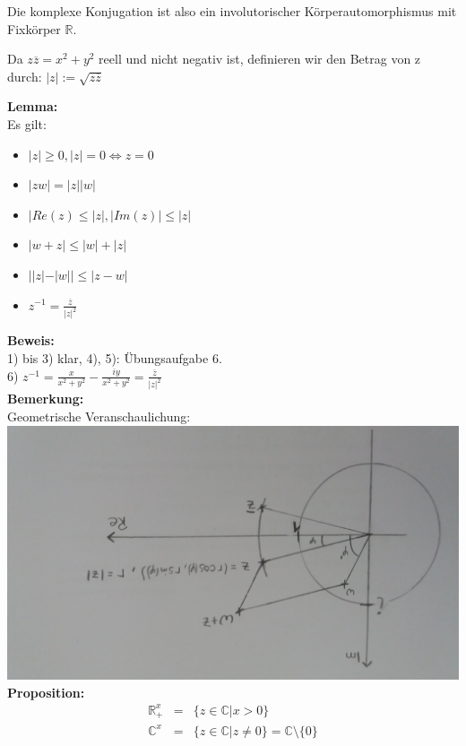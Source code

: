 Die komplexe Konjugation ist also ein involutorischer Körperautomorphismus mit Fixkörper $\mathds{R}$.\\
\begin{definition}
	Da $z\overline{z} = x^2+y^2$ reell und nicht negativ ist, definieren wir den Betrag von z durch: $|z|:= \sqrt{z\overline{z}}$
\end{definition}

\textbf{Lemma: }\\
Es gilt:
\begin{itemize}
	\item
	$|z| \geq 0, |z| = 0 \Leftrightarrow z = 0$
	\item
	$|zw| = |z||w|$
	\item
	$|Re(z) \leq |z|, |Im(z)| \leq |z|$
	\item
	 $|w+z| \leq |w|+|z|$
	 \item
	 $||z|-|w|| \leq |z-w|$
	 \item
	 $z^{-1} = \frac{\overline{z}}{|z|^2}$
\end{itemize}
\textbf{Beweis: }\\
1) bis 3) klar, 4), 5): Übungsaufgabe 6.\\
6) $z^{-1} =  \frac{x}{x^2 +y^2}- \frac{iy}{x^2+y^2} = \frac{\overline{z}}{|z|^2}$\\

\textbf{Bemerkung:}\\
Geometrische Veranschaulichung: \\
\includegraphics[scale=0.1, angle=180]{pics/Polar.jpg} \\

\textbf{Proposition: }\\
\begin{eqnarray*}
\mathds{R}^x_+ &=& \{z \in \mathds{C}| x > 0\} \\
\mathds{C}^x &=& \{ z \in \mathds{C} | z \neq 0\} =  \mathds{C} \setminus\{0\} 
\end{eqnarray*}

